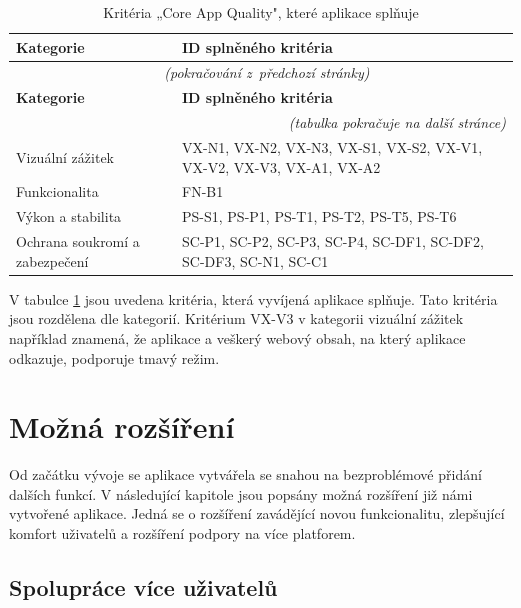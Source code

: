 \documentclass[czech, bc, kiv, he, iso690numb]{fasthesis}
\begin{document}
\begin{center}
\begin{longtable}{p{} p{}}
\caption{Kritéria „Core App Quality", které aplikace splňuje}
\label{tab:kriteria}\\
\toprule[1.5pt]
\textbf{Kategorie} & \textbf{ID splněného kritéria}\\
\midrule
\endfirsthead
\multicolumn{2}{c}{\tablename{}~\thetable{}
    \textit{(pokračování z~předchozí stránky)}}\\
\midrule
\textbf{Kategorie} & \textbf{ID splněného kritéria}\\
\midrule
\endhead
\midrule
\multicolumn{2}{r}{%
    \textit{(tabulka pokračuje na další stránce)}}\\
\endfoot
\bottomrule[1.5pt]
\endlastfoot
Vizuální zážitek & VX-N1, VX-N2, VX-N3, VX-S1, VX-S2, VX-V1,
VX-V2, VX-V3, VX-A1, VX-A2 \\ \hline
Funkcionalita & FN-B1 \\ \hline
Výkon a stabilita & PS-S1, PS-P1, PS-T1, PS-T2, PS-T5, PS-T6 \\ \hline
Ochrana soukromí a zabezpečení & SC-P1, SC-P2, SC-P3, SC-P4, SC-DF1, SC-DF2, SC-DF3, SC-N1, SC-C1 \\ \hline
\end{longtable}
\end{center}

V tabulce \ref{tab:kriteria} jsou uvedena kritéria, která vyvíjená aplikace splňuje. Tato kritéria jsou rozdělena dle kategorií. Kritérium VX-V3 v kategorii vizuální zážitek například znamená, že aplikace a veškerý webový obsah, na který aplikace odkazuje, podporuje tmavý režim.  

%
%
%
%
\chapter{Možná rozšíření}

 Od začátku vývoje se aplikace vytvářela se snahou na bezproblémové přidání dalších funkcí. V následující kapitole jsou popsány možná rozšíření již námi vytvořené aplikace. Jedná se o rozšíření zavádějící novou funkcionalitu, zlepšující komfort uživatelů a rozšíření podpory na více platforem.

\section{Spolupráce více uživatelů}
\end{document}
